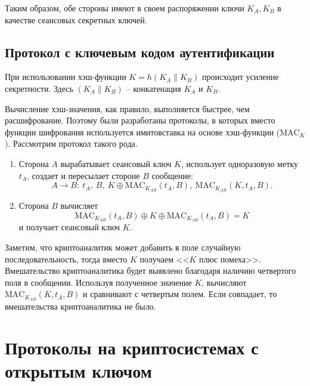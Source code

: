 \documentclass[10pt,a4paper]{book}
\newcommand{\MAC}{\textrm{MAC}}
\begin{document}
Таким образом, обе стороны имеют в своем распоряжении ключи $K_A, K_B$ в качестве сеансовых секретных ключей.


\subsection{Протокол с ключевым кодом аутентификации}

При использовании хэш-функции $K = h(K_{A} \| K_{B})$ происходит усиление секретности. Здесь $(K_{A} \| K_{B})$ -- конкатенация $K_{A} $ и $K_{B}$.


Вычисление хэш-значения, как правило, выполняется быстрее, чем расшифрование. Поэтому были разработаны протоколы, в которых вместо функции шифрования используется имитовставка на основе хэш-функции ($\MAC_K$). Рассмотрим протокол такого рода.
\begin{enumerate}
    \item Сторона $A$ вырабатывает сеансовый ключ $K$, использует одноразовую метку $t_{A}$, создает и пересылает стороне $B$ сообщение:
            \[ A \rightarrow B: ~ t_A, ~ B, ~ K \oplus \MAC_{K_{AB}}( t_A, B), ~ \MAC_{K_{AB}}(K, t_A, B). \]
    \item Сторона $B$ вычисляет
            \[ \MAC_{K_{AB}}(t_A, B) \oplus K \oplus \MAC_{K_{AB}}(t_A, B) = K \]
        и получает сеансовый ключ $K$.
\end{enumerate}

Заметим, что криптоаналитик может добавить в поле случайную последовательность, тогда вместо $K$ получаем <<$K$ плюс помеха>>. Вмешательство криптоаналитика будет выявлено благодаря наличию четвертого поля в сообщении. Используя полученное значение $K$, вычисляют $\MAC_{K_{AB}}(K, t_A, B)$ и сравнивают с четвертым полем. Если совпадает, то вмешательства криптоаналитика не было.



\section{Протоколы на криптосистемах с открытым ключом}
\end{document}
